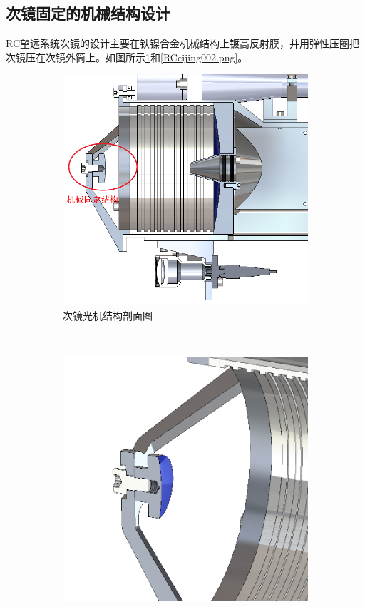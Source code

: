 \subsection{次镜固定的机械结构设计}
RC望远系统次镜的设计主要在铁镍合金机械结构上镀高反射膜，并用弹性压圈把次镜压在次镜外筒上。如图所示\ref{RCcijing001.png}和\ref{RCcijing002.png}。
\begin{figure}[!htbp]
	\centering
	\begin{subfigure}[c]{0.5\textwidth}
		\includegraphics[width=\textwidth]{./Img/RCcijing001.png}
		\caption{次镜光机结构剖面图}
		\label{RCcijing001.png}
	\end{subfigure}%
	~%
	\begin{subfigure}[c]{0.5\textwidth}
		\includegraphics[width=\textwidth]{./Img/RCcijing002.png}

\end{subfigure}
\end{figure}
